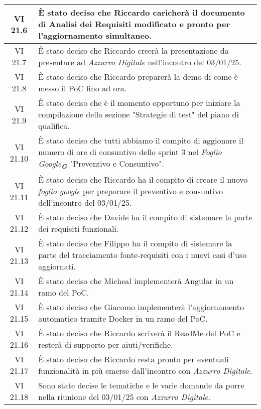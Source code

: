 \begin{table}[htbp]
\begin{tabular}{|c|p{}|}
        \hline
        VI 21.6 & È stato deciso che Riccardo caricherà il documento di Analisi dei Requisiti modificato e pronto per l'aggiornamento simultaneo.\\
        \hline    
        VI 21.7 & È stato deciso che Riccardo creerà la presentazione da presentare ad \emph{Azzurro Digitale} nell'incontro del 03/01/25. \\
        \hline 
        VI 21.8 & È stato deciso che Riccardo preparerà la demo di come è messo il PoC fino ad ora. \\
        \hline 
        VI 21.9 & È stato deciso che è il momento opportuno per iniziare la compilazione della sezione "Strategie di test" del piano di qualifica. \\
        \hline 
        VI 21.10 & È stato deciso che tutti abbiamo il compito di aggionare il numero di ore di consuntivo dello sprint 3 nel \emph{Foglio Google}\textsubscript{\textit{\textbf{G}}} "Preventivo e Consuntivo". \\
        \hline 
        VI 21.11 & È stato deciso che Riccardo ha il compito di creare il nuovo \emph{foglio google} per preparare il preventivo e consuntivo dell'incontro del 03/01/25.\\
        \hline
        VI 21.12 & È stato deciso che Davide ha il compito di sistemare la parte dei requisiti funzionali.\\
        \hline  
        VI 21.13 & È stato deciso che Filippo ha il compito di sistemare la parte del tracciamento fonte-requisiti con i nuovi casi d'uso aggiornati.\\
        \hline  
        VI 21.14 & È stato deciso che Micheal implementerà Angular in un ramo del PoC.\\
        \hline  
        VI 21.15 & È stato deciso che Giacomo implementerà l'aggiornamento automatico tramite Docker in un ramo del PoC.\\
        \hline  
        VI 21.16 & È stato deciso che Riccardo scriverà il ReadMe del PoC e resterà di supporto per aiuti/verifiche. \\
        \hline  
        VI 21.17 & È stato deciso che Riccardo resta pronto per eventuali funzionalità in più emerse dall'incontro con \emph{Azzurro Digitale}.\\
        \hline  
        VI 21.18 & Sono state decise le tematiche e le varie domande da porre nella riunione del 03/01/25 con \emph{Azzurro Digitale}.\\
        \hline
          

    \end{tabular}
\end{table}

